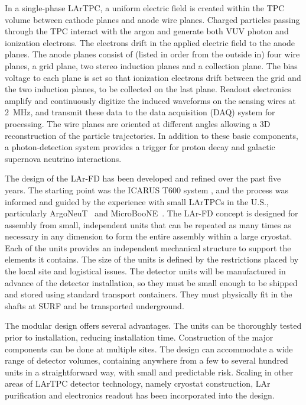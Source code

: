 In a single-phase LArTPC, a uniform electric field is created within the TPC volume between cathode planes and anode wire planes. Charged particles passing through the TPC interact with the argon and generate both VUV photon and ionization electrons. The electrons drift in the applied electric field to the anode planes. The anode planes consist of (listed in order from the outside in) four wire planes, a grid plane, two stereo induction planes and a collection plane. The bias voltage to each plane is set so that ionization electrons drift between the grid and the two induction planes, to be collected on the last plane. Readout electronics amplify and continuously digitize the induced waveforms on the sensing wires at 2~MHz, and transmit these data to the data acquisition (DAQ)  system for processing. The wire planes are oriented at different angles allowing a 3D reconstruction of the particle trajectories. In addition to these basic components, a photon-detection system provides a trigger for proton decay and galactic supernova neutrino interactions. 


The design of the LAr-FD has been developed and refined over the past five years. The starting point was the ICARUS  T600 system \cite{Icarus-T600}, and the process was informed and guided by the experience with small  LArTPCs in the U.S., particularly ArgoNeuT~\cite{argoneut-url} and MicroBooNE~\cite{microboone-url}. The LAr-FD concept is designed for assembly from small, independent %
units that can be repeated %
as many times as necessary in any dimension to form the entire  assembly within a large cryostat. Each of the units provides an independent mechanical structure to support the elements it contains. 
 The size of the units is defined by the restrictions placed by the local site and logistical issues.  The detector units will be manufactured in advance of the detector installation, so they must be small enough to be shipped and stored using standard transport containers. They must physically fit in the shafts at SURF and %
 be transported underground. 
 
 The modular design offers several advantages.
The units can be thoroughly  tested prior to installation, reducing installation time. %
Construction of the major components can be done at multiple sites.
 The design can accommodate a wide range of detector volumes, containing anywhere from a few to several hundred units in a straightforward way, with small and predictable risk. Scaling in other areas of  LArTPC detector technology, namely cryostat construction, LAr purification and electronics readout has been incorporated into the design.



